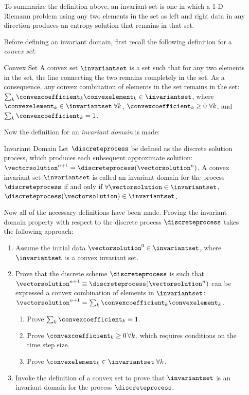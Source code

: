 To summarize the definition above, an invariant set is one in which
a 1-D Riemann problem using any two elements in the set as left and right
data in any direction produces an entropy solution that remains in that set.

Before defining an invariant domain, first recall the following definition
for a \emph{convex set}:
\begin{definition}{Convex Set}
A convex set $\invariantset$ is a set such that for any two elements in
the set, the line connecting the two remains completely in the set.
As a consequence, any convex combination of elements in the set remains in the
set: $\sum_k\convexcoefficient_k\convexelement_k\in\invariantset$, where
$\convexelement_k\in\invariantset\;\forall k$,
$\convexcoefficient_k\geq 0\,\,\forall k$, and $\sum_k\convexcoefficient_k=1$.
\end{definition}
Now the definition for an \emph{invariant domain} is made:
\begin{definition}{Invariant Domain}
Let $\discreteprocess$ be defined as the discrete solution process,
which produces each subsequent approximate solution:
$\vectorsolution^{n+1} = \discreteprocess(\vectorsolution^n)$.
A convex invariant set $\invariantset$ is called an invariant domain for the
process $\discreteprocess$ if and only if
$\forall\vectorsolution\in\invariantset$,
$\discreteprocess(\vectorsolution)\in\invariantset$.
\end{definition}
Now all of the necessary definitions have been made. Proving the invariant
domain property with respect to the discrete process $\discreteprocess$ takes
the following approach:
\begin{enumerate}
  \item Assume the initial data $\vectorsolution^0\in\invariantset$, where
    $\invariantset$ is a convex invariant set.
  \item Prove that the discrete scheme $\discreteprocess$ is such that
    $\vectorsolution^{n+1}\equiv\discreteprocess(\vectorsolution^n)$
    can be expressed a convex combination of elements in $\invariantset$:
    $\vectorsolution^{n+1}=\sum_k\convexcoefficient_k\convexelement_k$.
    \begin{enumerate}
      \item Prove $\sum_k\convexcoefficient_k=1$.
      \item Prove $\convexcoefficient_k\geq 0\,\forall k$, which requires
        conditions on the time step size.
      \item Prove $\convexelement_k\in\invariantset\;\forall k$.
    \end{enumerate}
  \item Invoke the definition of a convex set to prove that $\invariantset$
    is an invariant domain for the process $\discreteprocess$.
\end{enumerate}
